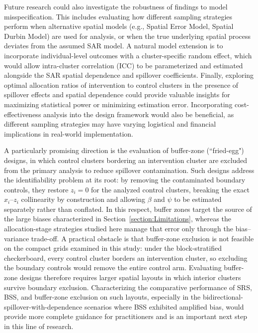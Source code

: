 \documentclass{article}[11pt]
\begin{document}
Future research could also investigate the robustness of findings to model
misspecification. This includes evaluating how different sampling strategies perform when
alternative spatial models (e.g., Spatial Error Model, Spatial Durbin Model) are used for
analysis, or when the true underlying spatial process deviates from the assumed SAR model. A natural model extension is to incorporate individual-level outcomes with a cluster-specific random effect, which would allow intra-cluster correlation (ICC) to be parameterized and estimated alongside the SAR spatial dependence and spillover coefficients. Finally, exploring optimal allocation ratios of intervention to control clusters in the presence of spillover effects and spatial dependence could provide valuable insights for maximizing statistical power or minimizing estimation error. Incorporating cost-effectiveness analysis into the design framework would also be beneficial, as different sampling strategies may have varying logistical and financial implications in real-world implementation.

A particularly promising direction is the evaluation of buffer-zone (``fried-egg") designs, in which control clusters bordering an intervention cluster are excluded from the primary analysis to reduce spillover contamination\cite{jarvis_spatial_2017}. Such designs address the identifiability problem at its root: by removing the contaminated boundary controls, they restore $z_i = 0$ for the analyzed control clusters, breaking the exact $x_i$--$z_i$ collinearity by construction and allowing $\beta$ and $\psi$ to be estimated separately rather than conflated. In this respect, buffer zones target the source of the large biases characterized in Section~\ref{section:Limitations}, whereas the allocation-stage strategies studied here manage that error only through the bias--variance trade-off. A practical obstacle is that buffer-zone exclusion is not feasible on the compact grids examined in this study: under the block-stratified checkerboard, every control cluster borders an intervention cluster, so excluding the boundary controls would remove the entire control arm. Evaluating buffer-zone designs therefore requires larger spatial layouts in which interior clusters survive boundary exclusion. Characterizing the comparative performance of SRS, BSS, and buffer-zone exclusion on such layouts, especially in the bidirectional-spillover-with-dependence scenarios where BSS exhibited amplified bias, would provide more complete guidance for practitioners and is an important next step in this line of research.
\end{document}
